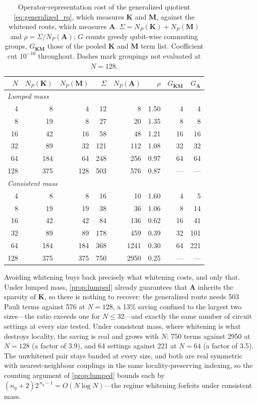 \documentclass{ieeeaccess}
\newcommand{\M}{\mathbf{M}}
\newcommand{\K}{\mathbf{K}}
\newcommand{\A}{\mathbf{A}}
\begin{document}
\begin{table}[t]
\centering
\caption{Operator-representation cost of the generalized quotient \eqref{eq:generalized_rq},
which measures $\K$ and $\M$, against the whitened route, which measures $\A$.
$\Sigma=N_P(\K)+N_P(\M)$ and $\rho=\Sigma/N_P(\A)$; $G$ counts greedy qubit-wise commuting
groups, $G_{\K\M}$ those of the pooled $\K$ and $\M$ term list. Coefficient cut $10^{-10}$
throughout. Dashes mark groupings not evaluated at $N=128$.}
\label{tab:genquotient}
\small
\setlength{\tabcolsep}{4pt}
\begin{tabular}{rrrrrrrr}
\toprule
$N$ & $N_P(\K)$ & $N_P(\M)$ & $\Sigma$ & $N_P(\A)$ & $\rho$ & $G_{\K\M}$ & $G_\A$\\
\midrule
\multicolumn{8}{l}{\emph{Lumped mass}}\\
4   & 8   & 4   & 12  & 8    & 1.50 & 4   & 4\\
8   & 19  & 8   & 27  & 20   & 1.35 & 8   & 8\\
16  & 42  & 16  & 58  & 48   & 1.21 & 16  & 16\\
32  & 89  & 32  & 121 & 112  & 1.08 & 32  & 32\\
64  & 184 & 64  & 248 & 256  & 0.97 & 64  & 64\\
128 & 375 & 128 & 503 & 576  & 0.87 & --- & ---\\
\midrule
\multicolumn{8}{l}{\emph{Consistent mass}}\\
4   & 8   & 8   & 16  & 10   & 1.60 & 4   & 5\\
8   & 19  & 19  & 38  & 36   & 1.06 & 8   & 14\\
16  & 42  & 42  & 84  & 136  & 0.62 & 16  & 41\\
32  & 89  & 89  & 178 & 459  & 0.39 & 32  & 101\\
64  & 184 & 184 & 368 & 1241 & 0.30 & 64  & 221\\
128 & 375 & 375 & 750 & 2950 & 0.25 & --- & ---\\
\bottomrule
\end{tabular}
\end{table}

Avoiding whitening buys back precisely what whitening costs, and only that. Under lumped mass,
\cref{prop:lumped} already guarantees that $\A$ inherits the sparsity of $\K$, so there is
nothing to recover: the generalized route needs 503 Pauli terms against 576 at $N=128$, a
13\% saving confined to the largest two sizes---the ratio exceeds one for $N\le32$---and
exactly the same number of circuit settings at every size tested. Under consistent mass, where
whitening is what destroys locality, the saving is real and grows with $N$: 750 terms against
2950 at $N=128$ (a factor of 3.9), and 64 settings against 221 at $N=64$ (a factor of 3.5).
The unwhitened pair stays banded at every size, and both are real symmetric with
nearest-neighbour couplings in the same locality-preserving indexing, so the counting argument
of \cref{prop:lumped} bounds each by $(n_q+2)2^{\,n_q-1}=O(N\log N)$---the regime whitening
forfeits under consistent mass.
\end{document}
